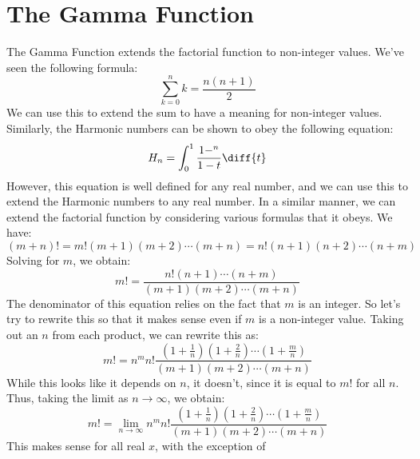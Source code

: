     \section{The Gamma Function}
        The Gamma Function extends the factorial function to
        non-integer values. We've seen the following formula:
        \begin{equation}
            \sum_{k=0}^{n}k=\frac{n(n+1)}{2}
        \end{equation}
        We can use this to extend the sum to have a meaning for
        non-integer values. Similarly, the Harmonic numbers can be
        shown to obey the following equation:
        \begin{equation}
            H_{n}=\int_{0}^{1}\frac{1-^{n}}{1-t}\diff{t}
        \end{equation}
        However, this equation is well defined for any real number,
        and we can use this to extend the Harmonic numbers to any
        real number. In a similar manner, we can extend the factorial
        function by considering various formulas that it obeys. We have:
        \begin{equation}
            (m+n)!=m!(m+1)(m+2)\cdots(m+n)=n!(n+1)(n+2)\cdots(n+m)
        \end{equation}
        Solving for $m$, we obtain:
        \begin{equation}
            m!=\frac{n!(n+1)\cdots(n+m)}{(m+1)(m+2)\cdots(m+n)}
        \end{equation}
        The denominator of this equation relies on the fact that
        $m$ is an integer. So let's try to rewrite this so that it makes
        sense even if $m$ is a non-integer value. Taking out an $n$ from
        each product, we can rewrite this as:
        \begin{equation}
            m!=n^{m}n!
                \frac{(1+\frac{1}{n})(1+\frac{2}{n})\cdots(1+\frac{m}{n})}
                     {(m+1)(m+2)\cdots(m+n)}
        \end{equation}
        While this looks like it depends on $n$, it doesn't, since it is
        equal to $m!$ for all $n$. Thus, taking the limit as
        $n\rightarrow\infty$, we obtain:
        \begin{equation}
            m!=\underset{n\rightarrow\infty}{\lim}n^{m}n!
                \frac{(1+\frac{1}{n})(1+\frac{2}{n})\cdots(1+\frac{m}{n})}
                     {(m+1)(m+2)\cdots(m+n)}
        \end{equation}
        This makes sense for all real $x$, with the exception of
